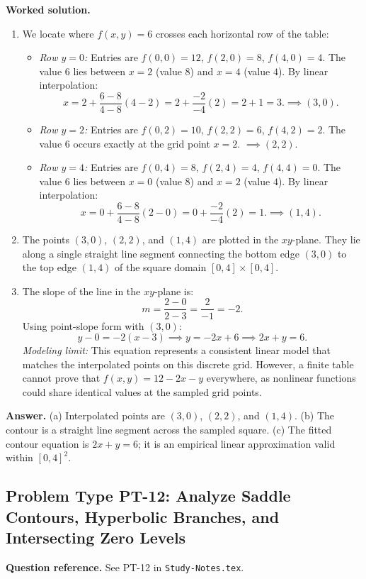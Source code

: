 \documentclass[11pt,letterpaper]{article}
\begin{document}
\textbf{Worked solution.}
\begin{enumerate}[label=(\alph*),leftmargin=*]
    \item We locate where $f(x,y) = 6$ crosses each horizontal row of the table:
    \begin{itemize}[nosep]
        \item \emph{Row $y = 0$:} Entries are $f(0,0)=12$, $f(2,0)=8$, $f(4,0)=4$. The value $6$ lies between $x=2$ (value $8$) and $x=4$ (value $4$). By linear interpolation:
        \[ x = 2 + \frac{6 - 8}{4 - 8}(4 - 2) = 2 + \frac{-2}{-4}(2) = 2 + 1 = 3. \implies (3, 0). \]
        \item \emph{Row $y = 2$:} Entries are $f(0,2)=10$, $f(2,2)=6$, $f(4,2)=2$. The value $6$ occurs exactly at the grid point $x = 2$. $\implies (2, 2)$.
        \item \emph{Row $y = 4$:} Entries are $f(0,4)=8$, $f(2,4)=4$, $f(4,4)=0$. The value $6$ lies between $x=0$ (value $8$) and $x=2$ (value $4$). By linear interpolation:
        \[ x = 0 + \frac{6 - 8}{4 - 8}(2 - 0) = 0 + \frac{-2}{-4}(2) = 1. \implies (1, 4). \]
    \end{itemize}
    \item The points $(3,0)$, $(2,2)$, and $(1,4)$ are plotted in the $xy$-plane. They lie along a single straight line segment connecting the bottom edge $(3,0)$ to the top edge $(1,4)$ of the square domain $[0,4] \times [0,4]$.
    \item The slope of the line in the $xy$-plane is:
    \[ m = \frac{2 - 0}{2 - 3} = \frac{2}{-1} = -2. \]
    Using point-slope form with $(3,0)$:
    \[ y - 0 = -2(x - 3) \implies y = -2x + 6 \implies 2x + y = 6. \]
    \emph{Modeling limit:} This equation represents a consistent linear model that matches the interpolated points on this discrete grid. However, a finite table cannot prove that $f(x,y) = 12 - 2x - y$ everywhere, as nonlinear functions could share identical values at the sampled grid points.
\end{enumerate}

\textbf{Answer.}
(a) Interpolated points are $(3,0)$, $(2,2)$, and $(1,4)$.
(b) The contour is a straight line segment across the sampled square.
(c) The fitted contour equation is $2x + y = 6$; it is an empirical linear approximation valid within $[0,4]^2$.

\subsection{Problem Type PT-12: Analyze Saddle Contours, Hyperbolic Branches, and Intersecting Zero Levels}
\textbf{Question reference.} See PT-12 in \texttt{Study-Notes.tex}.
\end{document}
